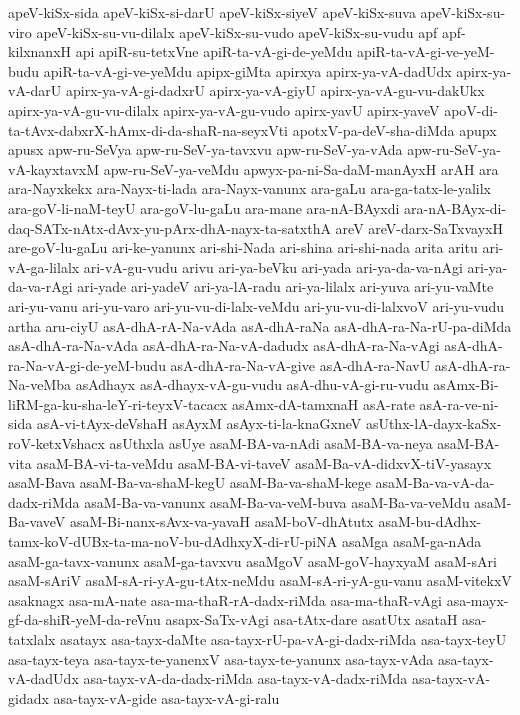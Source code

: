 {apeV-kiSx-sida
apeV-kiSx-si-darU
apeV-kiSx-siyeV
apeV-kiSx-suva
apeV-kiSx-su-viro
apeV-kiSx-su-vu-dilalx
apeV-kiSx-su-vudo
apeV-kiSx-su-vudu
apf
apf-kilxnanxH
api
apiR-su-tetxVne
apiR-ta-vA-gi-de-yeMdu
apiR-ta-vA-gi-ve-yeM-budu
apiR-ta-vA-gi-ve-yeMdu
apipx-giMta
apirxya
apirx-ya-vA-dadUdx
apirx-ya-vA-darU
apirx-ya-vA-gi-dadxrU
apirx-ya-vA-giyU
apirx-ya-vA-gu-vu-dakUkx
apirx-ya-vA-gu-vu-dilalx
apirx-ya-vA-gu-vudo
apirx-yavU
apirx-yaveV
apoV-di-ta-tAvx-dabxrX-hAmx-di-da-shaR-na-seyxVti
apotxV-pa-deV-sha-diMda
apupx
apusx
apw-ru-SeVya
apw-ru-SeV-ya-tavxvu
apw-ru-SeV-ya-vAda
apw-ru-SeV-ya-vA-kayxtavxM
apw-ru-SeV-ya-veMdu
apwyx-pa-ni-Sa-daM-manAyxH
arAH
ara
ara-Nayxkekx
ara-Nayx-ti-lada
ara-Nayx-vanunx
ara-gaLu
ara-ga-tatx-le-yalilx
ara-goV-li-naM-teyU
ara-goV-lu-gaLu
ara-mane
ara-nA-BAyxdi
ara-nA-BAyx-di-daq-SATx-nAtx-dAvx-yu-pArx-dhA-nayx-ta-satxthA
areV
areV-darx-SaTxvayxH
are-goV-lu-gaLu
ari-ke-yanunx
ari-shi-Nada
ari-shina
ari-shi-nada
arita
aritu
ari-vA-ga-lilalx
ari-vA-gu-vudu
arivu
ari-ya-beVku
ari-yada
ari-ya-da-va-nAgi
ari-ya-da-va-rAgi
ari-yade
ari-yadeV
ari-ya-lA-radu
ari-ya-lilalx
ari-yuva
ari-yu-vaMte
ari-yu-vanu
ari-yu-varo
ari-yu-vu-di-lalx-veMdu
ari-yu-vu-di-lalxvoV
ari-yu-vudu
artha
aru-ciyU
asA-dhA-rA-Na-vAda
asA-dhA-raNa
asA-dhA-ra-Na-rU-pa-diMda
asA-dhA-ra-Na-vAda
asA-dhA-ra-Na-vA-dadudx
asA-dhA-ra-Na-vAgi
asA-dhA-ra-Na-vA-gi-de-yeM-budu
asA-dhA-ra-Na-vA-give
asA-dhA-ra-NavU
asA-dhA-ra-Na-veMba
asAdhayx
asA-dhayx-vA-gu-vudu
asA-dhu-vA-gi-ru-vudu
asAmx-Bi-liRM-ga-ku-sha-leY-ri-teyxV-tacacx
asAmx-dA-tamxnaH
asA-rate
asA-ra-ve-ni-sida
asA-vi-tAyx-deVshaH
asAyxM
asAyx-ti-la-knaGxneV
asUthx-lA-dayx-kaSx-roV-ketxVshacx
asUthxla
asUye
asaM-BA-va-nAdi
asaM-BA-va-neya
asaM-BA-vita
asaM-BA-vi-ta-veMdu
asaM-BA-vi-taveV
asaM-Ba-vA-didxvX-tiV-yasayx
asaM-Bava
asaM-Ba-va-shaM-kegU
asaM-Ba-va-shaM-kege
asaM-Ba-va-vA-da-dadx-riMda
asaM-Ba-va-vanunx
asaM-Ba-va-veM-buva
asaM-Ba-va-veMdu
asaM-Ba-vaveV
asaM-Bi-nanx-sAvx-va-yavaH
asaM-boV-dhAtutx
asaM-bu-dAdhx-tamx-koV-dUBx-ta-ma-noV-bu-dAdhxyX-di-rU-piNA
asaMga
asaM-ga-nAda
asaM-ga-tavx-vanunx
asaM-ga-tavxvu
asaMgoV
asaM-goV-hayxyaM
asaM-sAri
asaM-sAriV
asaM-sA-ri-yA-gu-tAtx-neMdu
asaM-sA-ri-yA-gu-vanu
asaM-vitekxV
asaknagx
asa-mA-nate
asa-ma-thaR-rA-dadx-riMda
asa-ma-thaR-vAgi
asa-mayx-gf-da-shiR-yeM-da-reVnu
asapx-SaTx-vAgi
asa-tAtx-dare
asatUtx
asataH
asa-tatxlalx
asatayx
asa-tayx-daMte
asa-tayx-rU-pa-vA-gi-dadx-riMda
asa-tayx-teyU
asa-tayx-teya
asa-tayx-te-yanenxV
asa-tayx-te-yanunx
asa-tayx-vAda
asa-tayx-vA-dadUdx
asa-tayx-vA-da-dadx-riMda
asa-tayx-vA-dadx-riMda
asa-tayx-vA-gidadx
asa-tayx-vA-gide
asa-tayx-vA-gi-ralu
}
